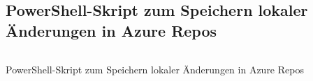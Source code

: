%
\begin{appendices}
\renewcommand{\thefigure}{\Alph{figure}} %
%
%

\section*{PowerShell-Skript zum Speichern lokaler Änderungen in Azure Repos}
\begin{code}
    \inputminted{PowerShell}{Pages/Code/Commit-Files.ps1}
    \caption{PowerShell-Skript zum Speichern lokaler Änderungen in Azure Repos}
    \label{code:PowerShell-CommitFull}
\end{code}


\end{appendices}